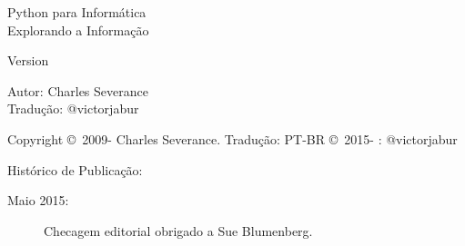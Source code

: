 



\def\exercisename{Exercício}

\newtheorem{ex}{\exercisename}[chapter]

\begin{latexonly}

\renewcommand{\blankpage}{\thispagestyle{empty} \quad \newpage}

\thispagestyle{empty}

\begin{flushright}
\vspace*{2.0in}

\begin{spacing}{3}
{\huge Python para Informática}\\
{\Large Explorando a Informação}
\end{spacing}

\vspace{0.25in}

Version \theversion

\vspace{0.5in}


{\Large
Autor: Charles Severance\\
Tradução: @victorjabur
}

\vfill

\end{flushright}

\pagebreak
\thispagestyle{empty}

{\small
Copyright \copyright ~2009- Charles Severance.
Tradução: PT-BR \copyright ~2015- : @victorjabur

Histórico de Publicação:

\begin{description}

\item[Maio 2015:] Checagem editorial obrigado a Sue Blumenberg.


\end{description}}
\end{latexonly}
